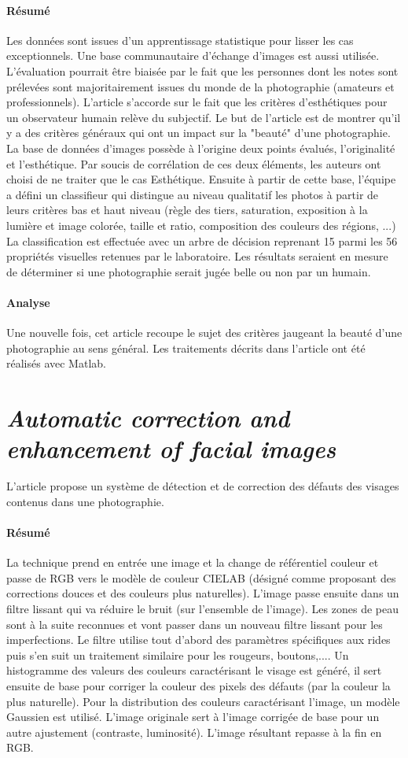\documentclass[11pt, french]{report-rd-info}
\begin{document}
\paragraph{Résumé}
Les données sont issues d'un apprentissage statistique pour lisser les cas exceptionnels. Une base communautaire d'échange d'images est aussi utilisée. L'évaluation pourrait être biaisée par le fait que les personnes dont les notes sont prélevées sont majoritairement issues du monde de la photographie (amateurs et professionnels). L'article s'accorde sur le fait que les critères d'esthétiques pour un observateur humain relève du subjectif. Le but de l'article est de montrer qu'il y a des critères généraux qui ont un impact sur la "beauté" d'une photographie. La base de données d'images possède à l'origine deux points évalués, l'originalité et l'esthétique. Par soucis de corrélation de ces deux éléments, les auteurs ont choisi de ne traiter que le cas Esthétique.
Ensuite à partir de cette base, l'équipe a défini un classifieur qui distingue au niveau qualitatif les photos à partir de leurs critères bas et haut niveau (règle des tiers, saturation, exposition à la lumière et image colorée, taille et ratio, composition des couleurs des régions, ...)
La classification est effectuée avec un arbre de décision reprenant 15 parmi les 56 propriétés visuelles retenues par le laboratoire. Les résultats seraient en mesure de déterminer si une photographie serait jugée belle ou non par un humain.
\paragraph{Analyse}
Une nouvelle fois, cet article recoupe le sujet des critères jaugeant la beauté d'une photographie au sens général. Les traitements décrits dans l’article ont été réalisés avec Matlab.
\section{\emph{Automatic correction and enhancement of facial images}}
L'article \cite{Konoplev2012} propose un système de détection et de correction des défauts des visages contenus dans une photographie.
\paragraph{Résumé}
La technique prend en entrée une image et la change de référentiel couleur et passe de RGB vers le modèle de couleur CIELAB (désigné comme proposant des corrections douces et des couleurs plus naturelles). L'image passe ensuite dans un filtre lissant qui va réduire le bruit (sur l’ensemble de l’image). Les zones de peau sont à la suite reconnues et vont passer dans un nouveau filtre lissant pour les imperfections.
Le filtre utilise tout d'abord des paramètres spécifiques aux rides puis s'en suit un traitement similaire pour les rougeurs, boutons,.... Un histogramme des valeurs des couleurs caractérisant le visage est généré, il sert ensuite de base pour corriger la couleur des pixels des défauts (par la couleur la plus naturelle). Pour la distribution des couleurs caractérisant l'image, un modèle Gaussien est utilisé. L’image originale sert à l'image corrigée de base pour un autre ajustement (contraste, luminosité). L'image résultant repasse à la fin en RGB.
\end{document}
